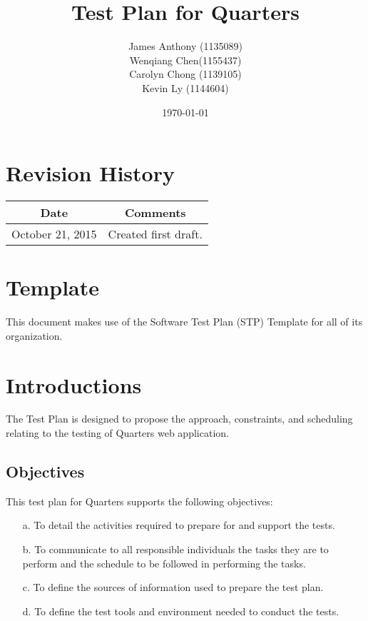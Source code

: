 \documentclass[12pt]{article}
\begin{document}
\title{Test Plan for Quarters} 
\author{James Anthony (1135089)\\ Wenqiang Chen(1155437)\\ Carolyn Chong 
(1139105)\\ Kevin Ly (1144604)}
\date{\today}
	
\maketitle

\pagebreak

\tableofcontents

\section*{Revision History}
\begin{tabular}{|c|c|}
\hline
\textbf{Date}  & \textbf{Comments} \\ \hline
October 21, 2015 & Created first draft. \\ 
\hline
\end{tabular}

\section*{Template}
This document makes use of the Software Test Plan (STP) Template for all of its organization.



%
%

\section{Introductions}
The Test Plan is designed to propose the approach, constraints, and scheduling relating to the testing of Quarters web application.


\subsection{Objectives}
This test plan for Quarters supports the following objectives:

\begin{enumerate}
\item[a.] To detail the activities required to prepare for and support the tests.
\item[b.] To communicate to all responsible individuals the tasks they are to perform and the schedule to be followed in performing the tasks.
\item[c.] To define the sources of information used to prepare the test plan.
\item[d.] To define the test tools and environment needed to conduct the tests.
\end{enumerate}
\end{document}
